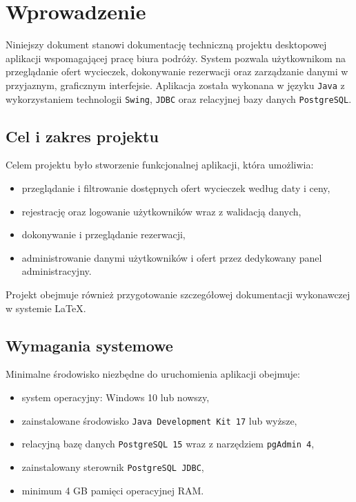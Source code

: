 \chapter{Wprowadzenie}

Niniejszy dokument stanowi dokumentację techniczną projektu desktopowej aplikacji wspomagającej pracę biura podróży. System pozwala użytkownikom na przeglądanie ofert wycieczek, dokonywanie rezerwacji oraz zarządzanie danymi w przyjaznym, graficznym interfejsie. Aplikacja została wykonana w języku \texttt{Java} z wykorzystaniem technologii \texttt{Swing}, \texttt{JDBC} oraz relacyjnej bazy danych \texttt{PostgreSQL}.

\section{Cel i zakres projektu}

Celem projektu było stworzenie funkcjonalnej aplikacji, która umożliwia:
\begin{itemize}
    \item przeglądanie i filtrowanie dostępnych ofert wycieczek według daty i ceny,
    \item rejestrację oraz logowanie użytkowników wraz z walidacją danych,
    \item dokonywanie i przeglądanie rezerwacji,
    \item administrowanie danymi użytkowników i ofert przez dedykowany panel administracyjny.
\end{itemize}

Projekt obejmuje również przygotowanie szczegółowej dokumentacji wykonawczej w systemie \LaTeX.

\section{Wymagania systemowe}

Minimalne środowisko niezbędne do uruchomienia aplikacji obejmuje:
\begin{itemize}
    \item system operacyjny: Windows 10 lub nowszy,
    \item zainstalowane środowisko \texttt{Java Development Kit 17} lub wyższe,
    \item relacyjną bazę danych \texttt{PostgreSQL 15} wraz z narzędziem \texttt{pgAdmin 4},
    \item zainstalowany sterownik \texttt{PostgreSQL JDBC},
    \item minimum 4 GB pamięci operacyjnej RAM.
\end{itemize}

